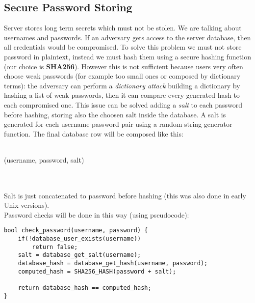 \subsection{Secure Password Storing}
Server stores long term secrets which must not be stolen. We are talking about usernames and passwords. If an adversary gets access to the server database, then all credentials would be compromised. To solve this problem we must not store password in plaintext, instead we must hash them using a secure hashing function (our choice is \textbf{SHA256}). However this is not sufficient because users very often choose weak passwords (for example too small ones or composed by dictionary terms): the adversary can perform a \textit{dictionary attack} building a dictionary by hashing a list of weak passwords, then it can compare every generated hash to each compromised one. This issue can be solved adding a \textit{salt} to each password before hashing, storing also the choosen salt inside the database. A salt is generated for each username-password pair using a random string generator function. The final database row will be composed like this:
\\\\\centerline{(username, password, salt)}\\\\
Salt is just concatenated to password before hashing (this was also done in early Unix versions).\\
Password checks will be done in this way (using pseudocode):
\begin{lstlisting}
bool check_password(username, password) {
	if(!database_user_exists(username))
		return false;
	salt = database_get_salt(username);
	database_hash = database_get_hash(username, password);
	computed_hash = SHA256_HASH(password + salt);

	return database_hash == computed_hash;
}
\end{lstlisting}
